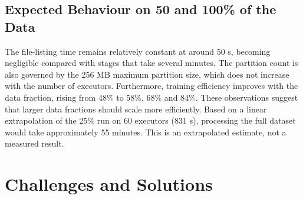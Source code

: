 \documentclass[a4paper, 11pt]{article} %
\begin{document}
\subsection{Expected Behaviour on 50 and 100\% of the Data}
The file-listing time remains relatively constant at around 50 s, becoming negligible compared with stages that take several minutes. The partition count is also governed by the 256 MB maximum partition size, which does not increase with the number of executors. Furthermore, training efficiency improves with the data fraction, rising from 48\% to 58\%, 68\% and 84\%. These observations suggest that larger data fractions should scale more efficiently. Based on a linear extrapolation of the 25\% run on 60 executors (831 s), processing the full dataset would take approximately 55 minutes. This is an extrapolated estimate, not a measured result.


\section{Challenges and Solutions}
\label{sec:challenges}
\end{document}
